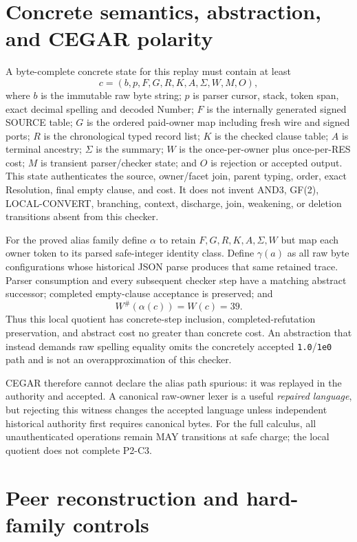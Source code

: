 \documentclass[11pt]{article}
\begin{document}
\section{Concrete semantics, abstraction, and CEGAR polarity}

A byte-complete concrete state for this replay must contain at least
\[
 c=(b,p,F,G,R,K,A,\Sigma,W,M,O),
\]
where $b$ is the immutable raw byte string; $p$ is parser cursor, stack, token
span, exact decimal spelling and decoded Number; $F$ is the internally generated
signed SOURCE table; $G$ is the ordered paid-owner map including fresh wire and
signed ports; $R$ is the chronological typed record list; $K$ is the checked
clause table; $A$ is terminal ancestry; $\Sigma$ is the summary; $W$ is the
once-per-owner plus once-per-RES cost; $M$ is transient parser/checker state; and
$O$ is rejection or accepted output.  This state authenticates the source,
owner/facet join, parent typing, order, exact Resolution, final empty clause, and
cost.  It does not invent AND3, GF(2), LOCAL-CONVERT, branching, context,
discharge, join, weakening, or deletion transitions absent from this checker.

For the proved alias family define $\alpha$ to retain $F,G,R,K,A,\Sigma,W$ but
map each owner token to its parsed safe-integer identity class.  Define
$\gamma(a)$ as all raw byte configurations whose historical JSON parse produces
that same retained trace.  Parser consumption and every subsequent checker step
have a matching abstract successor; completed empty-clause acceptance is
preserved; and
\[
  W^{\#}(\alpha(c))=W(c)=39.
\]
Thus this local quotient has concrete-step inclusion, completed-refutation
preservation, and abstract cost no greater than concrete cost.  An abstraction
that instead demands raw spelling equality omits the concretely accepted
\texttt{1.0}/\texttt{1e0} path and is not an overapproximation of this checker.

CEGAR therefore cannot declare the alias path spurious: it was replayed in the
authority and accepted.  A canonical raw-owner lexer is a useful \emph{repaired
language}, but rejecting this witness changes the accepted language unless
independent historical authority first requires canonical bytes.  For the full
calculus, all unauthenticated operations remain MAY transitions at safe charge;
the local quotient does not complete P2-C3.

\section{Peer reconstruction and hard-family controls}
\end{document}
